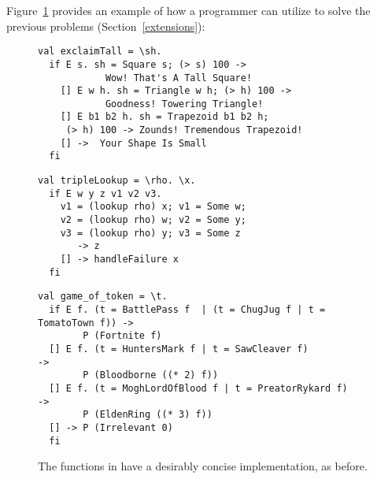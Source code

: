 \documentclass[manuscript,screen,review, 12pt, nonacm]{acmart}
\begin{document}
    Figure~\ref{fig:vminusfuncs} provides an example of how a programmer can
    utilize \VMinus to solve the previous problems (Section~\ref{extensions}): 
    
    
    \begin{figure}[ht] 
      \begin{minipage}[h]{0.54\linewidth}
        \vmlst 
        \begin{lstlisting}[numbers=none, basicstyle=\tiny, xleftmargin=.2em,
          showstringspaces=false,
          frame=single]
val exclaimTall = \sh.
  if E s. sh = Square s; (> s) 100 -> 
            Wow! That's A Tall Square!  
    [] E w h. sh = Triangle w h; (> h) 100 ->
            Goodness! Towering Triangle!
    [] E b1 b2 h. sh = Trapezoid b1 b2 h; 
     (> h) 100 -> Zounds! Tremendous Trapezoid!
    [] ->  Your Shape Is Small
  fi 
  \end{lstlisting}
          \label{fig:vmexclaimtall} 
      \end{minipage}%
      \begin{minipage}[h]{0.5\linewidth}
        \vmlst 
        \begin{lstlisting}[numbers=none, basicstyle=\tiny, xleftmargin=2em,
                      frame=single]
val tripleLookup = \rho. \x.
  if E w y z v1 v2 v3. 
    v1 = (lookup rho) x; v1 = Some w; 
    v2 = (lookup rho) w; v2 = Some y; 
    v3 = (lookup rho) y; v3 = Some z 
       -> z 
    [] -> handleFailure x
  fi 
   \end{lstlisting}
            \label{fig:vmtriplelookup} 
        \vspace{4ex}
      \end{minipage} 
      \begin{minipage}[h]{\linewidth}
        \vmlst 
        \begin{lstlisting}[numbers=none, basicstyle=\tiny, xleftmargin=9em,
          showstringspaces=false,
          frame=single]
val game_of_token = \t. 
  if E f. (t = BattlePass f  | (t = ChugJug f | t = TomatoTown f)) -> 
        P (Fortnite f)
  [] E f. (t = HuntersMark f | t = SawCleaver f)                   -> 
        P (Bloodborne ((* 2) f))
  [] E f. (t = MoghLordOfBlood f | t = PreatorRykard f)            -> 
        P (EldenRing ((* 3) f))
  [] -> P (Irrelevant 0)
  fi 
\end{lstlisting}
          \label{fig:vmgot}
      \vspace{4ex}
      \end{minipage}%
      \caption{The functions in \VMinus have a desirably concise
      implementation, as before.}
  \label{fig:vminusfuncs}
    \end{figure}   
\end{document}
